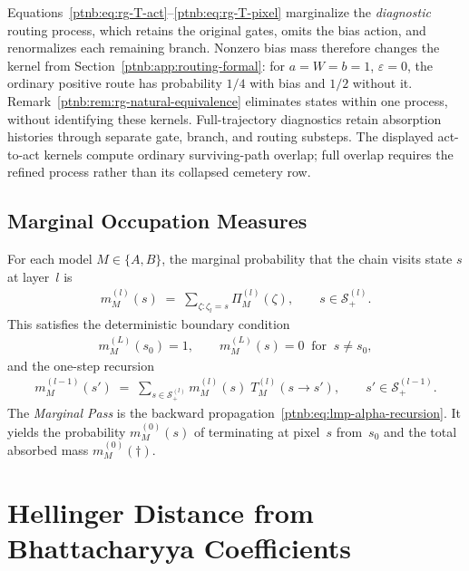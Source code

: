 Equations~\eqref{ptnb:eq:rg-T-act}--\eqref{ptnb:eq:rg-T-pixel} marginalize the
\emph{diagnostic} routing process, which retains the original gates, omits the bias
action, and renormalizes each remaining branch. Nonzero bias mass therefore
changes the kernel from Section~\ref{ptnb:app:routing-formal}: for $a=W=b=1$,
$\varepsilon=0$, the ordinary positive route has probability $1/4$ with bias and
$1/2$ without it. Remark~\ref{ptnb:rem:rg-natural-equivalence} eliminates states
within one process, without identifying these kernels. Full-trajectory diagnostics
retain absorption histories through separate gate, branch, and routing substeps.
The displayed act-to-act kernels compute ordinary surviving-path overlap;
full overlap requires the refined process rather than its collapsed cemetery row.

\subsection{Marginal Occupation Measures}\label{ptnb:sec:lmp-marginals}

For each model $M \in \{A,B\}$, the marginal probability that the chain visits state $s$ at
layer~$l$ is
\begin{align}\label{ptnb:eq:lmp-alpha}
    m^{(l)}_M(s) \;=\; \sum_{\zeta: \zeta_l = s} \Pi^{(l)}_M(\zeta),
    \qquad s \in \mathcal{S}^{(l)}_+.
\end{align}
This satisfies the deterministic boundary condition
\begin{align}\label{ptnb:eq:lmp-alpha-boundary}
    m^{(L)}_M(s_0) = 1, \qquad m^{(L)}_M(s) = 0 \;\;\text{for}\;\; s \neq s_0,
\end{align}
and the one-step recursion
\begin{align}\label{ptnb:eq:lmp-alpha-recursion}
    m^{(l-1)}_M(s') \;=\; \sum_{s \in \mathcal{S}^{(l)}_+} m^{(l)}_M(s)\; T^{(l)}_M(s \to s'),
    \qquad s' \in \mathcal{S}^{(l-1)}_+.
\end{align}
The \emph{Marginal Pass} is the backward propagation~\eqref{ptnb:eq:lmp-alpha-recursion}.
It yields the probability $m^{(0)}_M(s)$ of terminating at pixel~$s$ from~$s_0$ and
the total absorbed mass $m^{(0)}_M(\dagger)$.

\section{Hellinger Distance from Bhattacharyya Coefficients}\label{ptnb:sec:lmp-hellinger-distance}\label{subsec:hellinger_definition}

